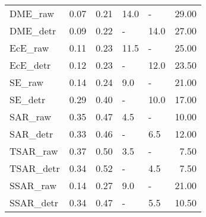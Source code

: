 \begin{tabular}{lllllr}
\midrule
DME\_raw & 0.07 & 0.21 & 14.0 & - & 29.00 \\
DME\_detr & 0.09 & 0.22 & - & 14.0 & 27.00 \\
\midrule
EcE\_raw & 0.11 & 0.23 & 11.5 & - & 25.00 \\
EcE\_detr & 0.12 & 0.23 & - & 12.0 & 23.50 \\
\midrule
SE\_raw & 0.14 & 0.24 & 9.0 & - & 21.00 \\
SE\_detr & 0.29 & 0.40 & - & 10.0 & 17.00 \\
\midrule
SAR\_raw & 0.35 & 0.47 & 4.5 & - & 10.00 \\
SAR\_detr & 0.33 & 0.46 & - & 6.5 & 12.00 \\
\midrule
TSAR\_raw & 0.37 & 0.50 & 3.5 & - & 7.50 \\
TSAR\_detr & 0.34 & 0.52 & - & 4.5 & 7.50 \\
\midrule
SSAR\_raw & 0.14 & 0.27 & 9.0 & - & 21.00 \\
SSAR\_detr & 0.34 & 0.47 & - & 5.5 & 10.50 \\
\midrule
\bottomrule
\end{tabular}
\midrule
